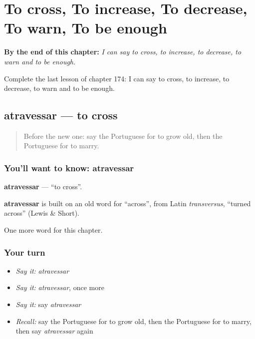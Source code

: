
\chapter{To cross, To increase, To decrease, To warn, To be enough}
\label{ch:pt-to-cross-to-increase-to-decrease-to-warn-to-be-enough}

\begin{chapteropening}
\textbf{By the end of this chapter:} \emph{I can say to cross, to increase, to decrease, to warn and to be enough.}

Complete the last lesson of chapter 174: I can say to cross, to increase, to decrease, to warn and to be enough.
\end{chapteropening}

\section[atravessar]{atravessar — to cross}

\label{lesson:PT-C174-atravessar}



\begin{quote}
Before the new one: say the Portuguese for to grow old, then the Portuguese for to marry.
\end{quote}

\subsection*{You'll want to know: atravessar}
\textbf{atravessar} — \textquotedblleft{}to cross\textquotedblright{}.

\begin{cousinweb}
\textbf{atravessar} is built on an old word for \textquotedblleft{}across\textquotedblright{}, from Latin \emph{transversus}, \textquotedblleft{}turned across\textquotedblright{} (Lewis \& Short).
\end{cousinweb}

\begin{grammarlens}[title={What you've built}]
One more word for this chapter.
\end{grammarlens}

\subsection*{Your turn}
\begin{itemize}
\raggedright
  \item \emph{Say it:} \emph{atravessar}
  \item \emph{Say it:} \emph{atravessar}, once more
  \item \emph{Say it:} say \emph{atravessar}
  \item \emph{Recall:} say the Portuguese for to grow old, then the Portuguese for to marry, then say \emph{atravessar} again
\end{itemize}

